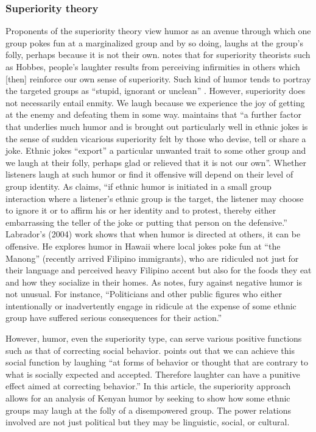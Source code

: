 \documentclass[output=paper]{langsci/langscibook}
\begin{document}
\subsubsection{Superiority theory}

Proponents of the superiority theory view humor as an avenue through which one group pokes fun at a marginalized group and by so doing, laughs at the group’s folly, perhaps because it is not their own. \citet[8]{Carroll2014} notes that for superiority theorists such as Hobbes, people’s laughter results from perceiving infirmities in others which [then] reinforce our own sense of superiority. Such kind of humor tends to portray the targeted groups as “stupid, ignorant or unclean” \citep[115]{Apte1985}. However, superiority does not necessarily entail enmity. We laugh because we experience the joy of getting at the enemy and defeating them in some way. \citet[7]{Davies1990} maintains that “a further factor that underlies much humor and is brought out particularly well in ethnic jokes is the sense of sudden vicarious superiority felt by those who devise, tell or share a joke. Ethnic jokes “export” a particular unwanted trait to some other group and we laugh at their folly, perhaps glad or relieved that it is not our own”. Whether listeners laugh at such humor or find it offensive will depend on their level of group identity. As \citet[34]{Apte1987} claims, “if ethnic humor is initiated in a small group interaction where a listener’s ethnic group is the target, the listener may choose to ignore it or to affirm his or her identity and to protest, thereby either embarrassing the teller of the joke or putting that person on the defensive.” Labrador’s (2004) work shows that when humor is directed at others, it can be offensive. He explores humor in Hawaii where local jokes poke fun at “the Manong” (recently arrived Filipino immigrants), who are ridiculed not just for their language and perceived heavy Filipino accent but also for the foods they eat and how they socialize in their homes. As \citet[35]{Apte1987} notes, fury against negative humor is not unusual. For instance, “Politicians and other public figures who either intentionally or inadvertently engage in ridicule at the expense of some ethnic group have suffered serious consequences for their action.”

However, humor, even the superiority type, can serve various positive functions such as that of correcting social behavior. \citet[x]{Ziv1988} points out that we can achieve this social function by laughing “at forms of behavior or thought that are contrary to what is socially expected and accepted. Therefore laughter can have a punitive effect aimed at correcting behavior.” In this article, the superiority approach allows for an analysis of Kenyan humor by seeking to show how some ethnic groups may laugh at the folly of a disempowered group. The power relations involved are not just political but they may be linguistic, social, or cultural. 
\end{document}
